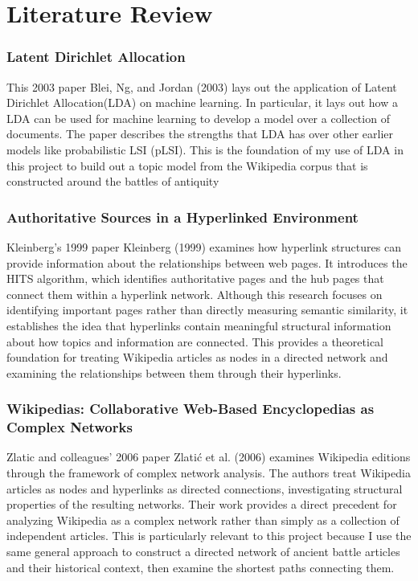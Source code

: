 \documentclass[
  letterpaper,
  DIV=11,
  numbers=noendperiod]{scrartcl}
\begin{document}
\section{Literature Review}\label{literature-review}

\subsubsection{Latent Dirichlet
Allocation}\label{latent-dirichlet-allocation}

This 2003 paper Blei, Ng, and Jordan (2003) lays out the application of
Latent Dirichlet Allocation(LDA) on machine learning. In particular, it
lays out how a LDA can be used for machine learning to develop a model
over a collection of documents. The paper describes the strengths that
LDA has over other earlier models like probabilistic LSI (pLSI). This is
the foundation of my use of LDA in this project to build out a topic
model from the Wikipedia corpus that is constructed around the battles
of antiquity

\subsubsection{Authoritative Sources in a Hyperlinked
Environment}\label{authoritative-sources-in-a-hyperlinked-environment}

Kleinberg's 1999 paper Kleinberg (1999) examines how hyperlink
structures can provide information about the relationships between web
pages. It introduces the HITS algorithm, which identifies authoritative
pages and the hub pages that connect them within a hyperlink network.
Although this research focuses on identifying important pages rather
than directly measuring semantic similarity, it establishes the idea
that hyperlinks contain meaningful structural information about how
topics and information are connected. This provides a theoretical
foundation for treating Wikipedia articles as nodes in a directed
network and examining the relationships between them through their
hyperlinks.

\subsubsection{Wikipedias: Collaborative Web-Based Encyclopedias as
Complex
Networks}\label{wikipedias-collaborative-web-based-encyclopedias-as-complex-networks}

Zlatic and colleagues' 2006 paper Zlatić et al. (2006) examines
Wikipedia editions through the framework of complex network analysis.
The authors treat Wikipedia articles as nodes and hyperlinks as directed
connections, investigating structural properties of the resulting
networks. Their work provides a direct precedent for analyzing Wikipedia
as a complex network rather than simply as a collection of independent
articles. This is particularly relevant to this project because I use
the same general approach to construct a directed network of ancient
battle articles and their historical context, then examine the shortest
paths connecting them.
\end{document}
